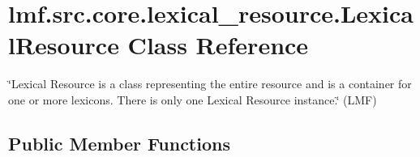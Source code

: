 \hypertarget{classlmf_1_1src_1_1core_1_1lexical__resource_1_1_lexical_resource}{\section{lmf.\+src.\+core.\+lexical\+\_\+resource.\+Lexical\+Resource Class Reference}
\label{classlmf_1_1src_1_1core_1_1lexical__resource_1_1_lexical_resource}
}


\char`\"{}\+Lexical Resource is a class representing the entire resource and is a container for one or more lexicons. There is only one Lexical Resource instance.\char`\"{} (L\+M\+F)  


\subsection*{Public Member Functions}
